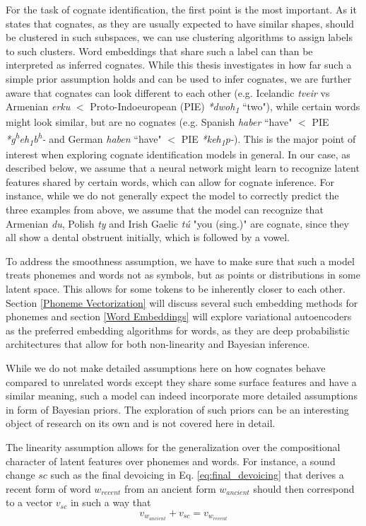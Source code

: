 \documentclass[6pt]{article}
\begin{document}
For the task of cognate identification, the first point is the most important. As it states that cognates, as they are usually expected to have similar shapes, should be clustered in such subspaces, we can use clustering algorithms to assign labels to such clusters. Word embeddings that share such a label can than be interpreted as inferred cognates. While this thesis investigates in how far such a simple prior assumption holds and can be used to infer cognates, we are further aware that cognates can look different to each other (e.g. Icelandic \textit{tveir} vs Armenian \textit{erku} $<$ Proto-Indoeuropean (PIE) \textit{*dwoh\textsubscript{1}} ``two"), while certain words might look similar, but are no cognates (e.g. Spanish \textit{haber} ``have" $<$ PIE \textit{*g\textsuperscript{h}eh\textsubscript{1}b\textsuperscript{h}-} and German \textit{haben} ``have" $<$ PIE \textit{*keh\textsubscript{1}p-}). This is the major point of interest when exploring cognate identification models in general. In our case, as described below, we assume that a neural network might learn to recognize latent features shared by certain words, which can allow for cognate inference. For instance, while we do not generally expect the model to correctly predict the three examples from above, we assume that the model can recognize that Armenian \textit{du}, Polish \textit{ty} and Irish Gaelic \textit{tú} "you (sing.)" are cognate, since they all show a dental obstruent initially, which is followed by a vowel. 

To address the smoothness assumption, we have to make sure that such a model treats phonemes and words not as symbols, but as points or distributions in some latent space. This allows for some tokens to be inherently closer to each other. Section \ref{Phoneme Vectorization} will discuss several such embedding methods for phonemes and section \ref{Word Embeddings} will explore variational autoencoders \citep{kingma2013auto} as the preferred embedding algorithms for words, as they are deep probabilistic architectures that allow for both non-linearity and Bayesian inference. 

While we do not make detailed assumptions here on how cognates behave compared to unrelated words except they share some surface features and have a similar meaning, such a model can indeed incorporate more detailed assumptions in form of Bayesian priors. The exploration of such priors can be an interesting object of research on its own and is not covered here in detail.

The linearity assumption allows for the generalization over the compositional character of latent features over phonemes and words. For instance, a sound change $sc$ such as the final devoicing in Eq. \ref{eq:final_devoicing} that derives a recent form of word $w_{recent}$ from an ancient form  $w_{ancient}$ should then correspond to a vector $v_{sc}$ in such a way that 
\begin{equation}
\label{eq:sound_change_linear_dependency}
v_{w_{ancient}}+v_{sc} = v_{w_{recent}}
\end{equation}
\end{document}

